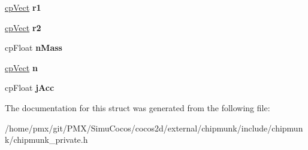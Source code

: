 \begin{DoxyCompactItemize}
\hyperlink{structcpVect}{cp\+Vect} {\bfseries r1}
\item 
\mbox{\label{structcpDampedSpring_a0dd22a669019cfa056e74b4f748c41b7}} 
\hyperlink{structcpVect}{cp\+Vect} {\bfseries r2}
\item 
\mbox{\label{structcpDampedSpring_a7345162bd8d559fca663af2263ce262f}} 
cp\+Float {\bfseries n\+Mass}
\item 
\mbox{\label{structcpDampedSpring_acc3698e3f3252f62917a2554f0edf69f}} 
\hyperlink{structcpVect}{cp\+Vect} {\bfseries n}
\item 
\mbox{\label{structcpDampedSpring_ab747cd9a7a810442486286138edb7abe}} 
cp\+Float {\bfseries j\+Acc}
\end{DoxyCompactItemize}


The documentation for this struct was generated from the following file\+:\begin{DoxyCompactItemize}
\item 
/home/pmx/git/\+P\+M\+X/\+Simu\+Cocos/cocos2d/external/chipmunk/include/chipmunk/chipmunk\+\_\+private.\+h\end{DoxyCompactItemize}
